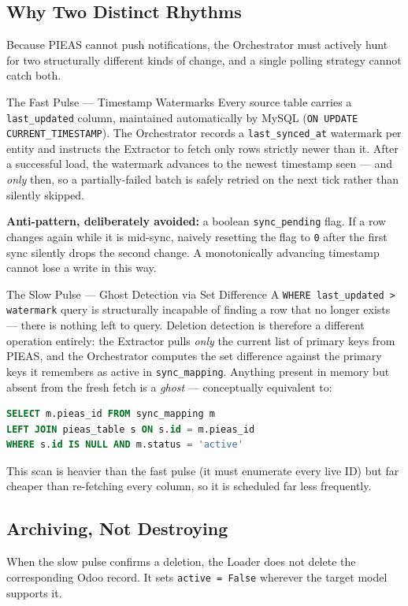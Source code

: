 \documentclass[11pt,a4paper]{article}
\begin{document}
\subsection{Why Two Distinct Rhythms}
Because PIEAS cannot push notifications, the Orchestrator must actively hunt for two structurally different kinds of change, and a single polling strategy cannot catch both.

\begin{principlebox}{The Fast Pulse --- Timestamp Watermarks}
Every source table carries a \texttt{last\_updated} column, maintained automatically by MySQL (\texttt{ON UPDATE CURRENT\_TIMESTAMP}). The Orchestrator records a \texttt{last\_synced\_at} watermark per entity and instructs the Extractor to fetch only rows strictly newer than it. After a successful load, the watermark advances to the newest timestamp seen --- and \emph{only} then, so a partially-failed batch is safely retried on the next tick rather than silently skipped.

\textbf{Anti-pattern, deliberately avoided:} a boolean \texttt{sync\_pending} flag. If a row changes again while it is mid-sync, naively resetting the flag to \texttt{0} after the first sync silently drops the second change. A monotonically advancing timestamp cannot lose a write in this way.
\end{principlebox}

\begin{principlebox}{The Slow Pulse --- Ghost Detection via Set Difference}
A \texttt{WHERE last\_updated > watermark} query is structurally incapable of finding a row that no longer exists --- there is nothing left to query. Deletion detection is therefore a different operation entirely: the Extractor pulls \emph{only} the current list of primary keys from PIEAS, and the Orchestrator computes the set difference against the primary keys it remembers as active in \texttt{sync\_mapping}. Anything present in memory but absent from the fresh fetch is a \emph{ghost} --- conceptually equivalent to:
\begin{lstlisting}[language=SQL]
SELECT m.pieas_id FROM sync_mapping m
LEFT JOIN pieas_table s ON s.id = m.pieas_id
WHERE s.id IS NULL AND m.status = 'active'
\end{lstlisting}
This scan is heavier than the fast pulse (it must enumerate every live ID) but far cheaper than re-fetching every column, so it is scheduled far less frequently.
\end{principlebox}

\subsection{Archiving, Not Destroying}
When the slow pulse confirms a deletion, the Loader does not delete the corresponding Odoo record. It sets \texttt{active = False} wherever the target model supports it.
\end{document}
